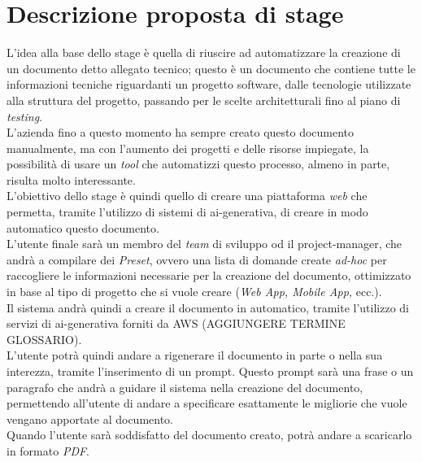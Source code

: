 \section{Descrizione proposta di stage}
\label{sez:descrizione-stage}

L'idea alla base dello stage è quella di riuscire ad automatizzare la creazione di un documento detto allegato tecnico; questo è un documento che contiene
tutte le informazioni tecniche riguardanti un progetto software, dalle tecnologie utilizzate alla struttura del progetto, passando per le scelte architetturali fino al piano di \textit{testing}.\\
L'azienda fino a questo momento ha sempre creato questo documento manualmente, ma con l'aumento dei progetti e delle risorse impiegate, la possibilità di usare un \textit{tool} che automatizzi questo processo,
almeno in parte, risulta molto interessante.\\

\noindent L'obiettivo dello stage è quindi quello di creare una piattaforma \textit{web} che permetta, tramite l'utilizzo di sistemi di \gls{ai-generativa}, di creare in modo automatico questo documento. \\
L'utente finale sarà un membro del \textit{team} di sviluppo od il \gls{project-manager}, che andrà a compilare dei \textit{Preset}, ovvero una lista di domande create \textit{ad-hoc} per raccogliere le informazioni necessarie per la creazione del documento,
ottimizzato in base al tipo di progetto che si vuole creare (\textit{Web App, Mobile App,} ecc.).\\
Il sistema andrà quindi a creare il documento in automatico, tramite l'utilizzo di servizi di \gls{ai-generativa} forniti da AWS (AGGIUNGERE TERMINE GLOSSARIO). \\

\noindent L'utente potrà quindi andare a rigenerare il documento in parte o nella sua interezza, tramite l'inserimento di un \gls{prompt}.
Questo \gls{prompt} sarà una frase o un paragrafo che andrà a guidare il sistema nella creazione del documento, permettendo all'utente di andare a specificare esattamente le migliorie che vuole vengano apportate al documento.\\
Quando l'utente sarà soddisfatto del documento creato, potrà andare a scaricarlo in formato \textit{PDF}.\\

